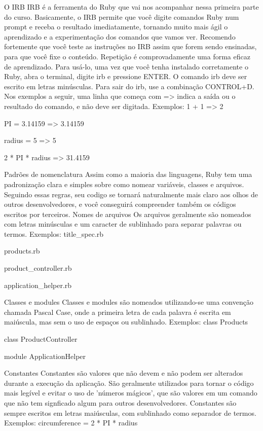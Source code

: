 \documentclass[12pt]{book} %
\begin{document}
O IRB
IRB é a ferramenta do Ruby que vai nos acompanhar nessa primeira parte do curso.
Basicamente, o IRB permite que você digite comandos Ruby num prompt e receba o resultado imediatamente, tornando muito mais ágil o aprendizado e a experimentação dos comandos que vamos ver.
Recomendo fortemente que você teste as instruções no IRB assim que forem sendo ensinadas, para que você fixe o conteúdo. Repetição é comprovadamente uma forma eficaz de aprendizado.
Para usá-lo, uma vez que você tenha instalado corretamente o Ruby, abra o terminal, digite irb e pressione ENTER. O comando irb deve ser escrito em letras minúsculas.
Para sair do irb, use a combinação CONTROL+D.
Nos exemplos a seguir, uma linha que começa com => indica a saída ou o resultado do comando, e não deve ser digitada.
Exemplos:
1 + 1
=> 2

PI = 3.14159
=> 3.14159

radius = 5
=> 5

2 * PI * radius
=> 31.4159

 
Padrões de nomenclatura
Assim como a maioria das linguagens, Ruby tem uma padronização clara e simples sobre como nomear variáveis, classes e arquivos. Seguindo essas regras, seu codigo se tornará naturalmente mais claro aos olhos de outros desenvolvedores, e você conseguirá compreender também os códigos escritos por terceiros.
Nomes de arquivos
Os arquivos geralmente são nomeados com letras minúsculas e um caracter de sublinhado para separar palavras ou termos.
Exemplos:
title\_spec.rb

products.rb

product\_controller.rb

application\_helper.rb

Classes e modules
Classes e modules são nomeados utilizando-se uma convenção chamada Pascal Case, onde a primeira letra de cada palavra é escrita em maiúscula, mas sem o uso de espaços ou sublinhado.  
Exemplos:
class Products

class ProductController

module ApplicationHelper

Constantes
Constantes são valores que não devem e não podem ser alterados durante a execução da aplicação. São geralmente utilizados para tornar o código mais legível e evitar o uso de 'números mágicos', que são valores em um comando que não tem signficado algum para outros desenvolvedores.
Constantes são sempre escritos em letras maiúsculas, com sublinhado como separador de termos.
Exemplos:
circumference = 2 * PI * radius
\end{document}
